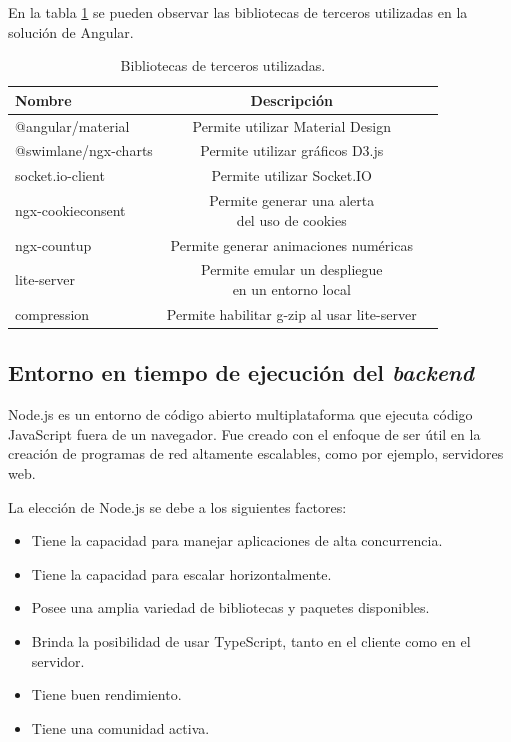 En la tabla \ref{tab:tablaBibliotecasAngular} se pueden observar las bibliotecas de terceros utilizadas en la solución de Angular.

\begin{table}[h]
	\centering
	\caption[Bibliotecas de terceros utilizadas]{Bibliotecas de terceros utilizadas.}
	\begin{tabular}{l c c}    
		\toprule
		\textbf{Nombre} & \textbf{Descripción}\\
		\midrule
		@angular/material \citep{WEBSITE:ANGULARMATERIALLIBRARY} & Permite utilizar Material Design \citep{WEBSITE:ANGULARMATERIAL} \\	
		@swimlane/ngx-charts \citep{WEBSITE:NGXCHARTS} & Permite utilizar gráficos D3.js \citep{WEBSITE:D3JS} \\	
		socket.io-client \citep{WEBSITE:SOCKETIOCLIENT} & Permite utilizar Socket.IO \citep{WEBSITE:SOCKETIO} \\	
		ngx-cookieconsent \citep{WEBSITE:NGXCOOKIECONSENT} & \shortstack{Permite generar una alerta \\ del uso de cookies \citep{WEBSITE:COOKIES}} \\	
		ngx-countup \citep{WEBSITE:NGXCOUNTUP}& Permite generar animaciones numéricas \\	
		lite-server \citep{WEBSITE:LITESERVER}& \shortstack{Permite emular un despliegue \\ en un entorno local} \\	
		compression \citep{WEBSITE:COMPRESSIONLBIRARY} & Permite habilitar g-zip \citep{WEBSITE:GZIP} al usar lite-server \\	
		\bottomrule
		\hline
	\end{tabular}
	\label{tab:tablaBibliotecasAngular}
\end{table}

\subsection{Entorno en tiempo de ejecución del \emph{backend}}

Node.js \citep{WEBSITE:NODEJS} es un entorno de código abierto multiplataforma que ejecuta código JavaScript fuera de un navegador. Fue creado con el enfoque de ser útil en la creación de programas de red altamente escalables, como por ejemplo, servidores web.

La elección de Node.js se debe a los siguientes factores: 
\begin{itemize}
	\item Tiene la capacidad para manejar aplicaciones de alta concurrencia.
	\item Tiene la capacidad para escalar horizontalmente.
	\item Posee una amplia variedad de bibliotecas y paquetes disponibles.
	\item Brinda la posibilidad de usar TypeScript, tanto en el cliente como en el servidor.
	\item Tiene buen rendimiento.
	\item Tiene una comunidad activa.
\end{itemize}

